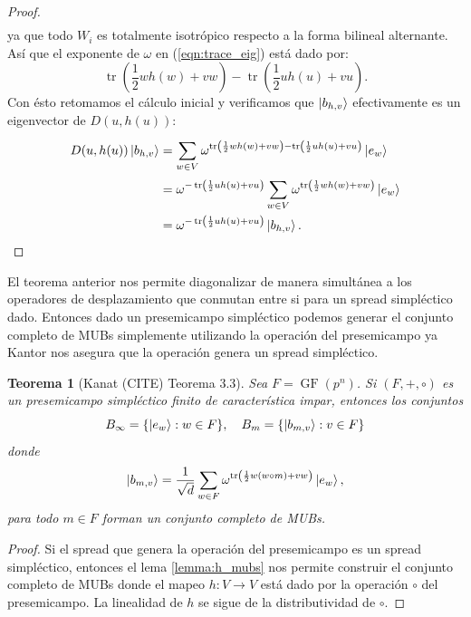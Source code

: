 \documentclass[a4paper]{report}
\DeclareMathOperator{\tr}{tr}
\DeclareMathOperator{\GF}{GF}
\newtheorem{theorem}{Teorema}
\begin{document}
\begin{proof}
\begin{align}
    \end{align}
    ya que todo $W_i$ es totalmente isotrópico respecto a la
    forma bilineal alternante. Así que el exponente de
    $\omega$ en (\ref{eqn:trace_eig}) está dado por: 
    \begin{equation}
      \tr\left( \frac{1}{2} w h(w) + v w \right)
      - \tr\left( \frac{1}{2} u h(u) + v u \right).
    \end{equation}
    Con ésto retomamos el cálculo inicial y verificamos que
    $\ket{b_{h,v}}$ efectivamente es un eigenvector de
    $D(u,h(u))$:
    \begin{align}
      D(u,h(u)) \ket{b_{h,v}}
      &= \sum_{w \in V}^{}
      \omega^{\tr\left(
          \frac{1}{2} w h(w) + v w
      \right)
      - \tr\left(
        \frac{1}{2} u h(u) + v u
      \right) } \ket{e_w} \\
      &= \omega^{-\tr\left(
          \frac{1}{2} u h(u) + v u
      \right) }
      \sum_{w \in V}^{}
      \omega^{\tr\left(
        \frac{1}{2} w h(w) + v w
      \right) } \ket{e_w} \\
      &= \omega^{-\tr\left(
        \frac{1}{2} u h(u) + v u
      \right) } \ket{b_{h,v}}.
    \end{align}
  \end{proof}

  El teorema anterior nos permite diagonalizar de manera
  simultánea a los operadores de desplazamiento que conmutan
  entre si para un spread simpléctico dado. Entonces dado un
  presemicampo simpléctico podemos generar el conjunto
  completo de MUBs simplemente utilizando la operación del
  presemicampo ya Kantor nos asegura que la operación genera
  un spread simpléctico.

  \begin{theorem}[Kanat (CITE) Teorema 3.3]
    \label{thm:kanat_presemi_mubs}
    Sea $F = \GF(p^{n})$. Si $(F, +, \circ)$ es un
    presemicampo simpléctico finito de característica impar,
    entonces los conjuntos
    \begin{equation}
      B_\infty = \{\ket{e_w} : w \in F\},
      \quad
      B_m = \{\ket{b_{m,v}} : v \in F\}
    \end{equation}
    donde 
    \begin{equation}
      \label{eqn:kanat_presemi_mubs}
      \ket{b_{m,v}}
      = \frac{1}{\sqrt{d}} \sum_{w \in F}^{}
      \omega^{\tr\left(
          \frac{1}{2} w (w \circ m) + v w
      \right) } \ket{e_w},
    \end{equation} 
    para todo $m \in F$ forman un conjunto completo de MUBs.
  \end{theorem}
  \begin{proof}
    Si el spread que genera la operación del presemicampo es
    un spread simpléctico, entonces el lema
    \ref{lemma:h_mubs} nos permite construir el conjunto
    completo de MUBs donde el mapeo $h : V \to V$ está dado
    por la operación $\circ$ del presemicampo. La linealidad
    de $h$ se sigue de la distributividad de $\circ$.
  \end{proof}
\end{document}
